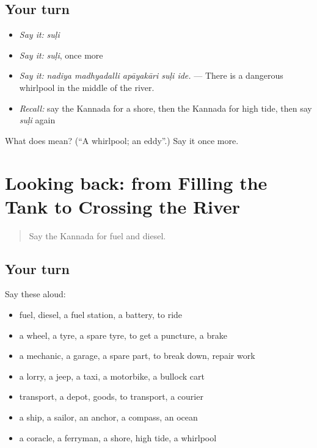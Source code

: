 \subsection*{Your turn}
\begin{itemize}
\raggedright
  \item \emph{Say it:} \emph{suḷi}
  \item \emph{Say it:} \emph{suḷi}, once more
  \item \emph{Say it:} \emph{nadiya madhyadalli apāyakāri suḷi ide.} — There is a dangerous whirlpool in the middle of the river.
  \item \emph{Recall:} say the Kannada for a shore, then the Kannada for high tide, then say \emph{suḷi} again
\end{itemize}

\begin{tcolorbox}[breakable,colback=teal!4,colframe=teal!35!black,title={Before you move on}]
What does  mean? (\textquotedblleft{}A whirlpool; an eddy\textquotedblright{}.) Say it once more.
\end{tcolorbox}
\section[(dialogue)]{Looking back: from Filling the Tank to Crossing the River}

\label{lesson:KA-R454-review-448-454}



\begin{quote}
Say the Kannada for fuel and diesel.
\end{quote}

\subsection*{Your turn}
Say these aloud:

\begin{itemize}
\raggedright
  \item fuel, diesel, a fuel station, a battery, to ride
  \item a wheel, a tyre, a spare tyre, to get a puncture, a brake
  \item a mechanic, a garage, a spare part, to break down, repair work
  \item a lorry, a jeep, a taxi, a motorbike, a bullock cart
  \item transport, a depot, goods, to transport, a courier
  \item a ship, a sailor, an anchor, a compass, an ocean
  \item a coracle, a ferryman, a shore, high tide, a whirlpool
\end{itemize}


